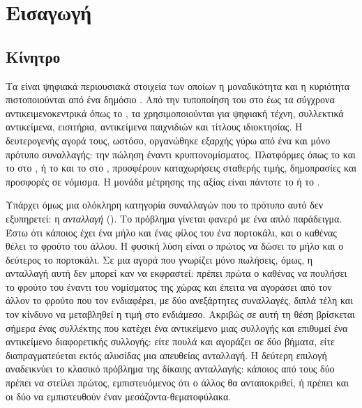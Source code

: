 \chapter{Εισαγωγή}
\label{ch:eisagogi}

\section{Κίνητρο}
\label{sec:kinitro}

Τα  είναι ψηφιακά περιουσιακά στοιχεία των οποίων η
μοναδικότητα και η κυριότητα πιστοποιούνται από ένα δημόσιο . Από την
τυποποίηση του  στο  \cite{erc721} έως τα σύγχρονα
αντικειμενοκεντρικά  όπως το  \cite{sui-whitepaper}, τα 
χρησιμοποιούνται για ψηφιακή τέχνη, συλλεκτικά αντικείμενα, εισιτήρια, αντικείμενα
παιχνιδιών και τίτλους ιδιοκτησίας. Η δευτερογενής αγορά τους, ωστόσο, οργανώθηκε εξαρχής
γύρω από ένα και μόνο πρότυπο συναλλαγής: την πώληση έναντι κρυπτονομίσματος. Πλατφόρμες
όπως το  \cite{opensea} και το  \cite{blur} στο , ή το
 \cite{tradeport} και το  \cite{bluemove} στο , προσφέρουν καταχωρήσεις σταθερής τιμής, δημοπρασίες και
προσφορές σε νόμισμα. Η μονάδα μέτρησης της αξίας είναι πάντοτε το  ή το
.

Υπάρχει όμως μια ολόκληρη κατηγορία συναλλαγών που το πρότυπο αυτό δεν εξυπηρετεί: η
\emph{ανταλλαγή} (). Το πρόβλημα γίνεται φανερό με ένα απλό παράδειγμα. Έστω
ότι κάποιος έχει ένα μήλο και ένας φίλος του ένα πορτοκάλι, και ο καθένας θέλει το φρούτο
του άλλου. Η φυσική λύση είναι ο πρώτος να δώσει το μήλο και ο δεύτερος το πορτοκάλι. Σε
μια αγορά που γνωρίζει μόνο πωλήσεις, όμως, η ανταλλαγή αυτή δεν μπορεί καν να εκφραστεί:
πρέπει πρώτα ο καθένας να πουλήσει το φρούτο του έναντι του νομίσματος της χώρας και έπειτα
να αγοράσει από τον άλλον το φρούτο που τον ενδιαφέρει, με δύο ανεξάρτητες συναλλαγές,
διπλά τέλη και τον κίνδυνο να μεταβληθεί η τιμή στο ενδιάμεσο. Ακριβώς σε αυτή τη θέση
βρίσκεται σήμερα ένας συλλέκτης που κατέχει ένα αντικείμενο μιας συλλογής και επιθυμεί ένα
αντικείμενο διαφορετικής συλλογής: είτε πουλά και αγοράζει σε δύο βήματα, είτε
διαπραγματεύεται εκτός αλυσίδας μια απευθείας ανταλλαγή. Η δεύτερη επιλογή αναδεικνύει το
κλασικό πρόβλημα της δίκαιης ανταλλαγής: κάποιος από τους δύο πρέπει να στείλει πρώτος,
εμπιστευόμενος ότι ο άλλος θα ανταποκριθεί, ή πρέπει και οι δύο να εμπιστευθούν έναν
μεσάζοντα-θεματοφύλακα.

